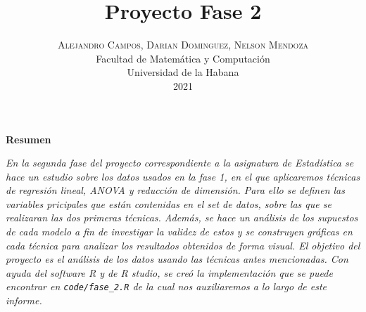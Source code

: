 \documentclass[twoside]{article}
\title{\vspace{-0.5cm}\fontsize{20pt}{10pt}\selectfont\textbf{Proyecto Fase 2}}
\author{
\large
\textsc{\vspace{-2cm} Alejandro Campos, Darian Dominguez, Nelson Mendoza}\\[3.5cm]
\normalsize Facultad de Matem\'atica y Computaci\'on \\
\normalsize Universidad de la Habana \\
\normalsize 2021 \\[1cm]
\vspace{-5mm}
}
\date{}
\begin{document}
\maketitle

\thispagestyle{fancy} 

\begin{center}
\textbf{Resumen}
\end{center}
\noindent \textit{En la segunda fase del proyecto correspondiente a la asignatura de Estad\'istica se hace un estudio sobre los datos usados en la fase 1, en el que aplicaremos t\'ecnicas de regresi\'on lineal, ANOVA y reducci\'on de dimensi\'on. Para ello se definen las variables pricipales que est\'an contenidas en el set de datos, sobre las que se realizaran las dos primeras t\'ecnicas. Adem\'as, se hace un an\'alisis de los supuestos de cada modelo a fin de investigar la validez de estos y se construyen gr\'aficas en cada t\'ecnica para analizar los resultados obtenidos de forma visual. El objetivo del proyecto es el an\'alisis de los datos usando las t\'ecnicas antes mencionadas. Con ayuda del software R y de R studio, se cre\'o la implementaci\'on que se puede encontrar en \texttt{code/fase\_2.R} de la cual nos auxiliaremos a lo largo de este informe.}\\[0.5cm]
\end{document}

